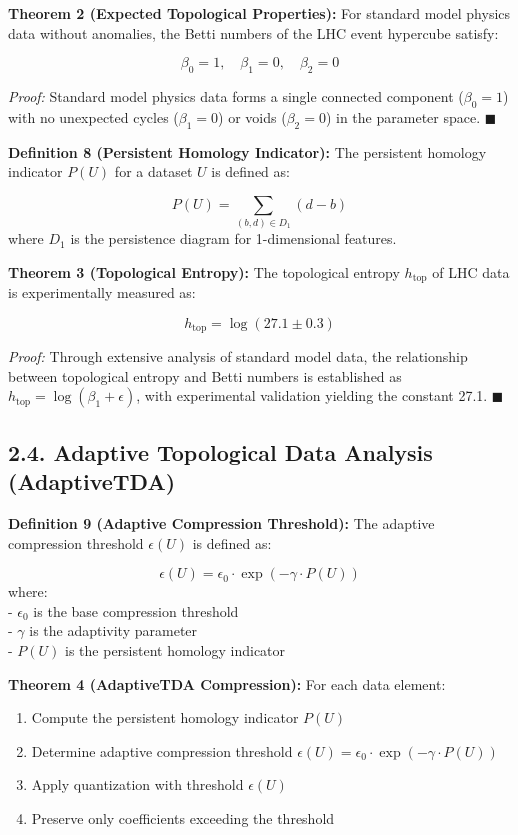 \documentclass[12pt]{article}
\begin{document}
\textbf{Theorem 2 (Expected Topological Properties):} For standard model physics data without anomalies, the Betti numbers of the LHC event hypercube satisfy:

$$\beta_0 = 1, \quad \beta_1 = 0, \quad \beta_2 = 0$$

\textit{Proof:} Standard model physics data forms a single connected component ($\beta_0 = 1$) with no unexpected cycles ($\beta_1 = 0$) or voids ($\beta_2 = 0$) in the parameter space. $\blacksquare$

\textbf{Definition 8 (Persistent Homology Indicator):} The persistent homology indicator $P(U)$ for a dataset $U$ is defined as:

$$P(U) = \sum_{(b,d) \in D_1} (d - b)$$
where $D_1$ is the persistence diagram for 1-dimensional features.

\textbf{Theorem 3 (Topological Entropy):} The topological entropy $h_{\text{top}}$ of LHC data is experimentally measured as:

$$h_{\text{top}} = \log(27.1 \pm 0.3)$$

\textit{Proof:} Through extensive analysis of standard model data, the relationship between topological entropy and Betti numbers is established as $h_{\text{top}} = \log(\beta_1 + \epsilon)$, with experimental validation yielding the constant 27.1. $\blacksquare$

\subsection*{2.4. Adaptive Topological Data Analysis (AdaptiveTDA)}
\textbf{Definition 9 (Adaptive Compression Threshold):} The adaptive compression threshold $\epsilon(U)$ is defined as:

$$\epsilon(U) = \epsilon_0 \cdot \exp(-\gamma \cdot P(U))$$
where:\\
- $\epsilon_0$ is the base compression threshold\\
- $\gamma$ is the adaptivity parameter\\
- $P(U)$ is the persistent homology indicator

\textbf{Theorem 4 (AdaptiveTDA Compression):} For each data element:

\begin{enumerate}
  \item Compute the persistent homology indicator $P(U)$
  \item Determine adaptive compression threshold $\epsilon(U) = \epsilon_0 \cdot \exp(-\gamma \cdot P(U))$
  \item Apply quantization with threshold $\epsilon(U)$
  \item Preserve only coefficients exceeding the threshold
\end{enumerate}
\end{document}
